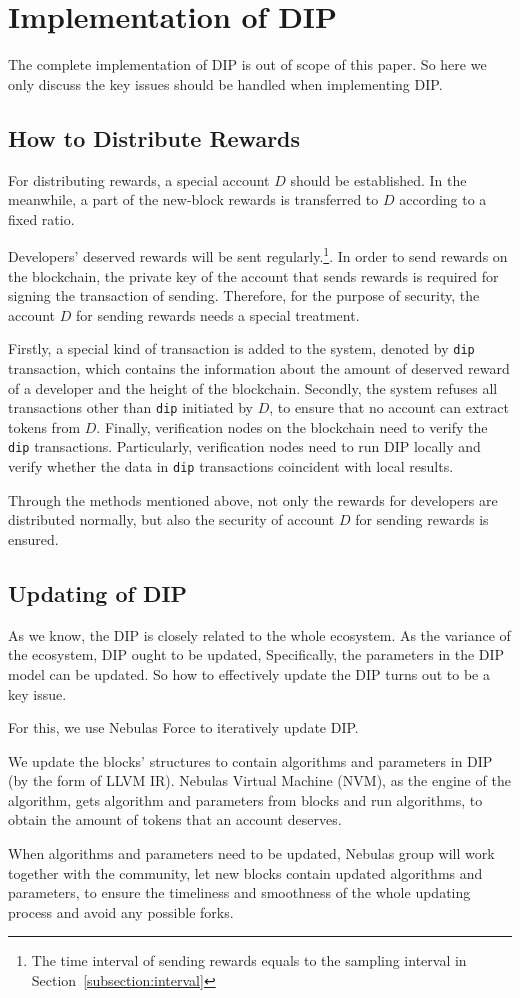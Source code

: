 \section{Implementation of DIP}

\noindent
The complete implementation of DIP is out of scope of this paper. So here we only discuss the key issues should be handled when implementing DIP\@.

\subsection{How to Distribute Rewards}
\noindent
For distributing rewards, a special account $D$ should be established. In the meanwhile, a part of the new-block rewards is transferred to $D$ according to a fixed ratio.


Developers' deserved rewards will be sent regularly.\footnote{The time interval of sending rewards equals to the sampling interval in Section~\ref{subsection:interval}}. In order to send rewards on the blockchain, the private key of the account that sends rewards is required for signing the transaction of sending. Therefore, for the purpose of security, the account $D$ for sending rewards needs a special treatment.

Firstly, a special kind of transaction is added to the system, denoted by \texttt{dip} transaction, which contains the information about the amount of deserved reward of a developer and the height of the blockchain. Secondly, the system refuses all transactions other than \texttt{dip} initiated by $D$, to ensure that no account can extract tokens from $D$. Finally, verification nodes on the blockchain  need to verify the \texttt{dip} transactions. Particularly, verification nodes need to run DIP locally and verify whether the data in \texttt{dip} transactions coincident with local results.

Through the methods mentioned above, not only the rewards for developers are distributed normally, but also the security of account $D$ for sending rewards is ensured.

\subsection{Updating of DIP}
\noindent
As we know, the DIP is closely related to the whole ecosystem. As the variance of the ecosystem, DIP ought to be updated, Specifically, the parameters in the DIP model can be updated. So how to effectively update the DIP turns out to be a key issue.

For this, we use Nebulas Force to iteratively update DIP\@.

We update the blocks' structures to contain algorithms and parameters in DIP (by the form of LLVM IR). Nebulas Virtual Machine (NVM), as the engine of the algorithm, gets algorithm and parameters from blocks and run algorithms, to obtain the amount of tokens that an account deserves.

When algorithms and parameters need to be updated, Nebulas group will work together with the community, let new blocks contain updated algorithms and parameters, to ensure the timeliness and smoothness of the whole updating process and avoid any possible forks.
